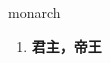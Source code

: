 
\begin{frame}
{\huge monarch}
\begin{center}
\begin{enumerate}\Large
  \item \textbf{君主，帝王}
\end{enumerate}
\end{center}
\end{frame}
